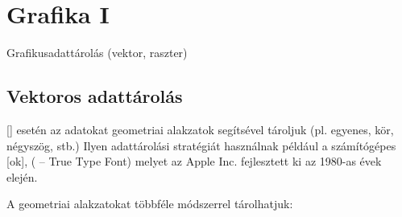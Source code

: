 \documentclass[../../main.tex]{subfiles}
\begin{document}
\section{Grafika I}

\begin{fulltheorem}
  Grafikusadattárolás (vektor, raszter)
\end{fulltheorem}

\subsection{Vektoros adattárolás}

[] esetén az adatokat geometriai alakzatok segítsével
tároljuk (pl. egyenes, kör, négyszög, stb.) Ilyen adattárolási stratégiát használnak
például a számítógépes [ok], ( -- True Type Font)
melyet az Apple Inc. fejlesztett ki az 1980-as évek elején.

A geometriai alakzatokat többféle módszerrel tárolhatjuk:
\end{document}
